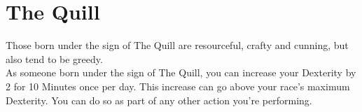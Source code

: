 \section{The Quill}\label{zodiac:quill}

Those born under the sign of The Quill are resourceful, crafty and cunning, but also tend to be greedy.\\
As someone born under the sign of The Quill, you can increase your Dexterity by 2 for 10 Minutes once per day.
This increase can go above your race's maximum Dexterity.
You can do so as part of any other action you're performing.\\